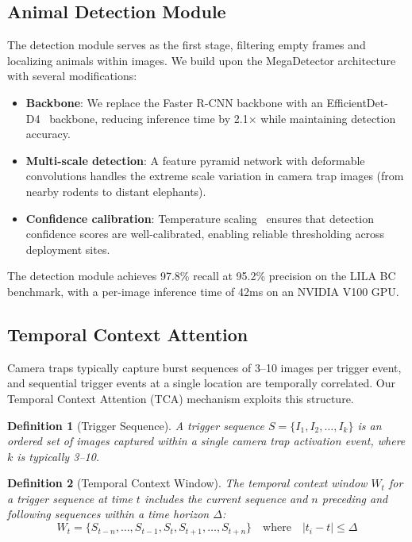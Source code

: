 \documentclass[11pt,letterpaper]{article}
\newtheorem{definition}{Definition}[section]
\begin{document}
\subsection{Animal Detection Module}

The detection module serves as the first stage, filtering empty frames and localizing animals within images. We build upon the MegaDetector architecture~\cite{beery2019mega} with several modifications:

\begin{itemize}[leftmargin=*]
    \item \textbf{Backbone}: We replace the Faster R-CNN backbone with an EfficientDet-D4~\cite{tan2020} backbone, reducing inference time by 2.1$\times$ while maintaining detection accuracy.
    \item \textbf{Multi-scale detection}: A feature pyramid network with deformable convolutions handles the extreme scale variation in camera trap images (from nearby rodents to distant elephants).
    \item \textbf{Confidence calibration}: Temperature scaling~\cite{guo2017} ensures that detection confidence scores are well-calibrated, enabling reliable thresholding across deployment sites.
\end{itemize}

The detection module achieves 97.8\% recall at 95.2\% precision on the LILA BC benchmark, with a per-image inference time of 42ms on an NVIDIA V100 GPU.

\subsection{Temporal Context Attention}

Camera traps typically capture burst sequences of 3--10 images per trigger event, and sequential trigger events at a single location are temporally correlated. Our Temporal Context Attention (TCA) mechanism exploits this structure.

\begin{definition}[Trigger Sequence]
A trigger sequence $S = \{I_1, I_2, \ldots, I_k\}$ is an ordered set of images captured within a single camera trap activation event, where $k$ is typically 3--10.
\end{definition}

\begin{definition}[Temporal Context Window]
The temporal context window $W_t$ for a trigger sequence at time $t$ includes the current sequence and $n$ preceding and following sequences within a time horizon $\Delta$:
\begin{equation}
W_t = \{S_{t-n}, \ldots, S_{t-1}, S_t, S_{t+1}, \ldots, S_{t+n}\} \quad \text{where} \quad |t_i - t| \leq \Delta
\end{equation}
\end{definition}
\end{document}
